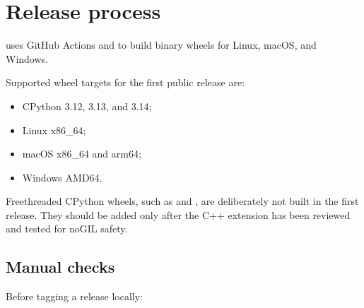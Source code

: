 \documentclass[a4paper,11pt,english]{sphinxmanual}
\begin{document}
\sphinxstepscope


\chapter{Release process}
\label{\detokenize{release:release-process}}\label{\detokenize{release::doc}}
\sphinxAtStartPar
{} uses GitHub Actions and  to build binary wheels for
Linux, macOS, and Windows.

\sphinxAtStartPar
Supported wheel targets for the first public release are:
\begin{itemize}
\item {} 
\sphinxAtStartPar
CPython 3.12, 3.13, and 3.14;

\item {} 
\sphinxAtStartPar
Linux  x86\_64;

\item {} 
\sphinxAtStartPar
macOS x86\_64 and arm64;

\item {} 
\sphinxAtStartPar
Windows AMD64.

\end{itemize}

\sphinxAtStartPar
Free\sphinxhyphen{}threaded CPython wheels, such as  and , are deliberately
not built in the first release. They should be added only after the C++ extension
has been reviewed and tested for no\sphinxhyphen{}GIL safety.


\section{Manual checks}
\label{\detokenize{release:manual-checks}}
\sphinxAtStartPar
Before tagging a release locally:

\begin{sphinxVerbatim}[commandchars=\\\{\}]
     \PYG{p}{[}\PYG{p}{]}
 
  
    
\end{sphinxVerbatim}
\end{document}
